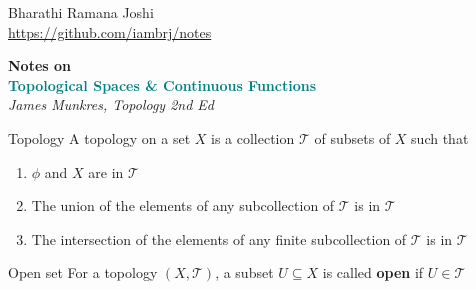\documentclass[titlepage, 12pt]{article}
\begin{document}
\begin{titlepage}

	\raggedleft

	\vspace*{\baselineskip}

	{Bharathi Ramana Joshi\\\url{https://github.com/iambrj/notes}}

	\vspace*{0.167\textheight}

    \textbf{\LARGE Notes on}\\[\baselineskip]

	\textbf{\textcolor{teal}{\huge Topological Spaces \& Continuous Functions}}\\[\baselineskip]

    {\Large \textit{James Munkres, Topology 2nd Ed}}

	\vfill

	\vspace*{3\baselineskip}

\end{titlepage}

\newpage

\begin{definition}{Topology}{}
 A topology on a set $X$ is a collection $\mathcal{T}$ of subsets of $X$ such
 that
 \begin{enumerate}
     \item $\phi$ and $X$ are in $\mathcal{T}$
     \item The union of the elements of any subcollection of $\mathcal{T}$ is in
         $\mathcal{T}$
     \item The intersection of the elements of any finite subcollection of
         $\mathcal{T}$ is in $\mathcal{T}$
 \end{enumerate}
\end{definition}

\begin{definition}{Open set}{}
    For a topology $(X, \mathcal{T})$, a subset $U\subseteq X$ is called
    \textbf{open} if $U\in\mathcal{T}$
\end{definition}
\end{document}
